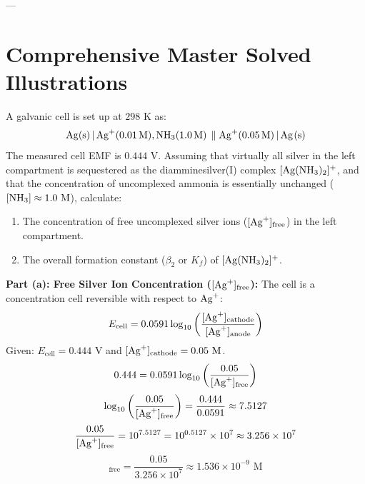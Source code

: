 ---

\section{Comprehensive Master Solved Illustrations}

\begin{examplebox}
A galvanic cell is set up at $298\text{ K}$ as:
\begin{equation*}
    \ce{Ag(s) | Ag+(0.01 M), NH3(1.0 M) \parallel Ag+(0.05 M) | Ag(s)}
\end{equation*}
The measured cell EMF is $0.444\text{ V}$. Assuming that virtually all silver in the left compartment is sequestered as the diamminesilver(I) complex $[\ce{Ag(NH3)2}]^+$, and that the concentration of uncomplexed ammonia is essentially unchanged ($[\ce{NH3}] \approx 1.0\text{ M}$), calculate:
\begin{enumerate}[label=(\alph*)]
    \item The concentration of free uncomplexed silver ions ($[\ce{Ag+}]_{\text{free}}$) in the left compartment.
    \item The overall formation constant ($\beta_2$ or $K_f$) of $[\ce{Ag(NH3)2}]^+$.
\end{enumerate}
\tcblower
\textbf{Part (a): Free Silver Ion Concentration ($[\ce{Ag+}]_{\text{free}}$):}
The cell is a concentration cell reversible with respect to $\ce{Ag+}$:
\begin{equation*}
    E_{\text{cell}} = 0.0591 \log_{10} \left( \frac{[\ce{Ag+}]_{\text{cathode}}}{[\ce{Ag+}]_{\text{anode}}} \right)
\end{equation*}
Given: $E_{\text{cell}} = 0.444\text{ V}$ and $[\ce{Ag+}]_{\text{cathode}} = 0.05\text{ M}$.
\begin{equation*}
    0.444 = 0.0591 \log_{10} \left( \frac{0.05}{[\ce{Ag+}]_{\text{free}}} \right)
\end{equation*}
\begin{equation*}
    \log_{10} \left( \frac{0.05}{[\ce{Ag+}]_{\text{free}}} \right) = \frac{0.444}{0.0591} \approx 7.5127
\end{equation*}
\begin{equation*}
    \frac{0.05}{[\ce{Ag+}]_{\text{free}}} = 10^{7.5127} = 10^{0.5127} \times 10^7 \approx 3.256 \times 10^7
\end{equation*}
\begin{equation*}
    [\ce{Ag+}]_{\text{free}} = \frac{0.05}{3.256 \times 10^7} \approx 1.536 \times 10^{-9}\text{ M}
\end{equation*}


\end{examplebox}
